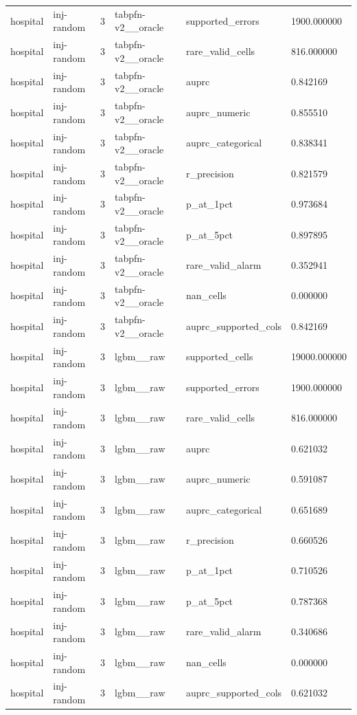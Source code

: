 \begin{tabular}{llllll}
hospital & inj-random & 3 & tabpfn-v2\_\_oracle & supported\_errors & 1900.000000 \\
hospital & inj-random & 3 & tabpfn-v2\_\_oracle & rare\_valid\_cells & 816.000000 \\
hospital & inj-random & 3 & tabpfn-v2\_\_oracle & auprc & 0.842169 \\
hospital & inj-random & 3 & tabpfn-v2\_\_oracle & auprc\_numeric & 0.855510 \\
hospital & inj-random & 3 & tabpfn-v2\_\_oracle & auprc\_categorical & 0.838341 \\
hospital & inj-random & 3 & tabpfn-v2\_\_oracle & r\_precision & 0.821579 \\
hospital & inj-random & 3 & tabpfn-v2\_\_oracle & p\_at\_1pct & 0.973684 \\
hospital & inj-random & 3 & tabpfn-v2\_\_oracle & p\_at\_5pct & 0.897895 \\
hospital & inj-random & 3 & tabpfn-v2\_\_oracle & rare\_valid\_alarm & 0.352941 \\
hospital & inj-random & 3 & tabpfn-v2\_\_oracle & nan\_cells & 0.000000 \\
hospital & inj-random & 3 & tabpfn-v2\_\_oracle & auprc\_supported\_cols & 0.842169 \\
hospital & inj-random & 3 & lgbm\_\_raw & supported\_cells & 19000.000000 \\
hospital & inj-random & 3 & lgbm\_\_raw & supported\_errors & 1900.000000 \\
hospital & inj-random & 3 & lgbm\_\_raw & rare\_valid\_cells & 816.000000 \\
hospital & inj-random & 3 & lgbm\_\_raw & auprc & 0.621032 \\
hospital & inj-random & 3 & lgbm\_\_raw & auprc\_numeric & 0.591087 \\
hospital & inj-random & 3 & lgbm\_\_raw & auprc\_categorical & 0.651689 \\
hospital & inj-random & 3 & lgbm\_\_raw & r\_precision & 0.660526 \\
hospital & inj-random & 3 & lgbm\_\_raw & p\_at\_1pct & 0.710526 \\
hospital & inj-random & 3 & lgbm\_\_raw & p\_at\_5pct & 0.787368 \\
hospital & inj-random & 3 & lgbm\_\_raw & rare\_valid\_alarm & 0.340686 \\
hospital & inj-random & 3 & lgbm\_\_raw & nan\_cells & 0.000000 \\
hospital & inj-random & 3 & lgbm\_\_raw & auprc\_supported\_cols & 0.621032 \\

\end{tabular}
